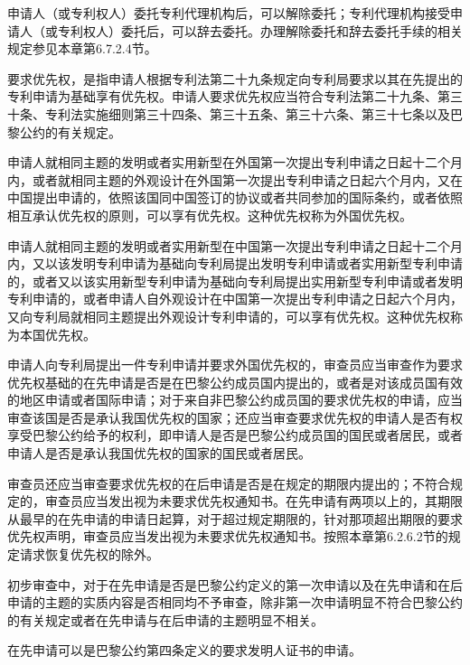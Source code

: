 申请人（或专利权人）委托专利代理机构后，可以解除委托；专利代理机构接受申请人（或专利权人）委托后，可以辞去委托。办理解除委托和辞去委托手续的相关规定参见本章第6.7.2.4节。

要求优先权，是指申请人根据专利法第二十九条规定向专利局要求以其在先提出的专利申请为基础享有优先权。申请人要求优先权应当符合专利法第二十九条、第三十条、专利法实施细则第三十四条、第三十五条、第三十六条、第三十七条以及巴黎公约的有关规定。

申请人就相同主题的发明或者实用新型在外国第一次提出专利申请之日起十二个月内，或者就相同主题的外观设计在外国第一次提出专利申请之日起六个月内，又在中国提出申请的，依照该国同中国签订的协议或者共同参加的国际条约，或者依照相互承认优先权的原则，可以享有优先权。这种优先权称为外国优先权。

申请人就相同主题的发明或者实用新型在中国第一次提出专利申请之日起十二个月内，又以该发明专利申请为基础向专利局提出发明专利申请或者实用新型专利申请的，或者又以该实用新型专利申请为基础向专利局提出实用新型专利申请或者发明专利申请的，或者申请人自外观设计在中国第一次提出专利申请之日起六个月内，又向专利局就相同主题提出外观设计专利申请的，可以享有优先权。这种优先权称为本国优先权。

申请人向专利局提出一件专利申请并要求外国优先权的，审查员应当审查作为要求优先权基础的在先申请是否是在巴黎公约成员国内提出的，或者是对该成员国有效的地区申请或者国际申请；对于来自非巴黎公约成员国的要求优先权的申请，应当审查该国是否是承认我国优先权的国家；还应当审查要求优先权的申请人是否有权享受巴黎公约给予的权利，即申请人是否是巴黎公约成员国的国民或者居民，或者申请人是否是承认我国优先权的国家的国民或者居民。

审查员还应当审查要求优先权的在后申请是否是在规定的期限内提出的；不符合规定的，审查员应当发出视为未要求优先权通知书。在先申请有两项以上的，其期限从最早的在先申请的申请日起算，对于超过规定期限的，针对那项超出期限的要求优先权声明，审查员应当发出视为未要求优先权通知书。按照本章第6.2.6.2节的规定请求恢复优先权的除外。

初步审查中，对于在先申请是否是巴黎公约定义的第一次申请以及在先申请和在后申请的主题的实质内容是否相同均不予审查，除非第一次申请明显不符合巴黎公约的有关规定或者在先申请与在后申请的主题明显不相关。

在先申请可以是巴黎公约第四条定义的要求发明人证书的申请。


